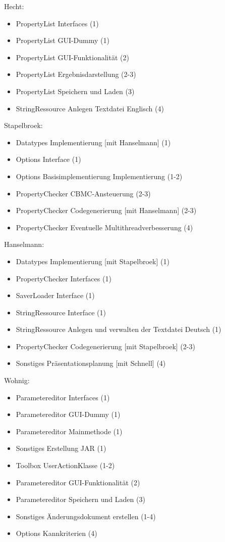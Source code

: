 \documentclass[a4paper]{scrreprt}
\begin{document}
\vspace{8mm}
Hecht: 
\begin{itemize}
\item PropertyList Interfaces (1)
\item PropertyList GUI-Dummy (1)
\item PropertyList GUI-Funktionalität (2)
\item PropertyList Ergebnisdarstellung (2-3)
\item PropertyList Speichern und Laden (3)
\item StringRessource Anlegen Textdatei Englisch (4)
\end{itemize} 
\vspace{8mm}
Stapelbroek:
\begin{itemize}
\item Datatypes Implementierung [mit Hanselmann] (1)
\item Options Interface (1)
\item Options Basisimplementierung Implementierung (1-2)
\item PropertyChecker CBMC-Ansteuerung (2-3) 
\item PropertyChecker Codegenerierung [mit Hanselmann] (2-3) 
\item PropertyChecker Eventuelle Multithreadverbesserung (4)
\end{itemize}
\vspace{8mm}
Hanselmann:
\begin{itemize}
\item Datatypes Implementierung [mit Stapelbroek] (1)
\item PropertyChecker Interfaces (1)
\item SaverLoader Interface (1)
\item StringRessource Interface (1)
\item StringRessource Anlegen und verwalten der Textdatei Deutsch (1)
\item PropertyChecker Codegenerierung [mit Stapelbroek] (2-3)
\item Sonstiges Präsentationsplanung [mit Schnell] (4)
\end{itemize}
\vspace{8mm}
Wohnig:
\begin{itemize}
\item Parametereditor Interfaces (1)
\item Parametereditor GUI-Dummy (1)
\item Parametereditor Mainmethode (1)
\item Sonstiges Erstellung JAR (1)
\item Toolbox UserActionKlasse (1-2)
\item Parametereditor GUI-Funktionalität (2)
\item Parametereditor Speichern und Laden (3)
\item Sonstiges Änderungsdokument erstellen (1-4)
\item Options Kannkriterien (4)
\end{itemize}
\end{document}
